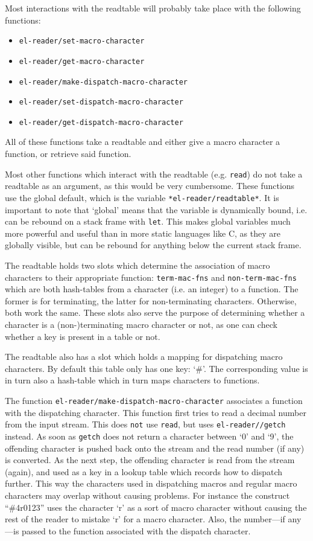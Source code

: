 \documentclass[a4paper,10pt,twoside]{report}
\newcommand{\sym}[1]{\texttt{#1}}
\newcommand{\fun}[1]{\texttt{#1}}
\newcommand{\Read}{\fun{read}}
\begin{document}
Most interactions with the readtable will probably take place with the following
functions:
\begin{itemize}
\item \fun{el-reader/set-macro-character} 
\item \fun{el-reader/get-macro-character}
\item \fun{el-reader/make-dispatch-macro-character}
\item \fun{el-reader/set-dispatch-macro-character}
\item \fun{el-reader/get-dispatch-macro-character}
\end{itemize}
All of these functions take a readtable and either give a macro character a
function, or retrieve said function.

Most other functions which interact with the readtable (e.g. \Read{}) do not
take a readtable as an argument, as this would be very cumbersome.  These
functions use the global default, which is the variable
\sym{*el-reader/readtable*}.  It is important to note that `global' means that
the variable is dynamically bound, i.e. can be rebound on a stack frame with
\fun{let}.  This makes global variables much more powerful and useful than in
more static languages like C, as they are globally visible, but can be rebound
for anything below the current stack frame.

The readtable holds two slots which determine the association of macro
characters to their appropriate function: \sym{term-mac-fns} and
\sym{non-term-mac-fns} which are both hash-tables from a character (i.e. an
integer) to a function.  The former is for terminating, the latter for
non-terminating characters.  Otherwise, both work the same.  These slots also
serve the purpose of determining whether a character is a (non-)terminating
macro character or not, as one can check whether a key is present in a table or
not.

The readtable also has a slot which holds a mapping for dispatching macro
characters.  By default this table only has one key: `\#'.  The corresponding
value is in turn also a hash-table which in turn maps characters to functions.

The function \fun{el-reader/make-dispatch-macro-character} associates a function
with the dispatching character.  This function first tries to read a decimal
number from the input stream.  This does \texttt{not} use \Read{}, but uses
\fun{el-reader//getch} instead.  As soon as \fun{getch} does not return a
character between `0' and `9', the offending character is pushed back onto the
stream and the read number (if any) is converted.  As the next step, the offending
character is read from the stream (again), and used as a key in a lookup table
which records how to dispatch further.  This way the characters used in
dispatching macros and regular macro characters may overlap without causing
problems.  For instance the construct ``\#4r0123'' uses the character `r' as a
sort of macro character without causing the rest of the reader to mistake `r'
for a macro character.  Also, the number---if any---is passed to the function
associated with the dispatch character.
\end{document}
